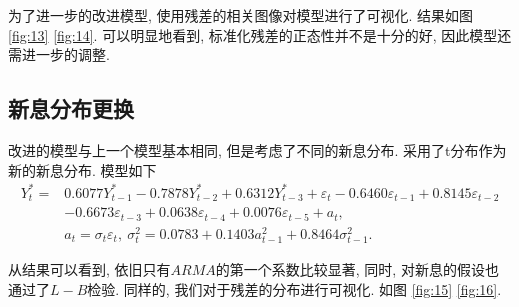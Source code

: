 \documentclass[12pt]{article}
\begin{document}
\qquad 为了进一步的改进模型, 使用残差的相关图像对模型进行了可视化. 结果如图 \ref{fig:13} \ref{fig:14}. 可以明显地看到, 标准化残差的正态性并不是十分的好, 因此模型还需进一步的调整.

\subsection{新息分布更换}
\qquad 改进的模型与上一个模型基本相同, 但是考虑了不同的新息分布. 采用了t分布作为新的新息分布. 模型如下
\[
    \begin{aligned}
        Y_{t}^*=&0.6077 Y_{t-1}^*-0.7878 Y_{t-2}^*+0.6312 Y_{t-3}^*+\varepsilon_{t}-0.6460\varepsilon_{t-1}+ 0.8145\varepsilon_{t-2}\\&-0.6673\varepsilon_{t-3}+0.0638\varepsilon_{t-4}+ 0.0076\varepsilon_{t-5}+a_{t},\\&a_{t}=\sigma_{t} \varepsilon_{t},\ 
        \sigma_{t}^{2} =0.0783+ 0.1403 a_{t-1}^{2}+ 0.8464 \sigma_{t-1}^{2}.
    \end{aligned}
\]

\qquad 从结果可以看到, 依旧只有$ARMA$的第一个系数比较显著, 同时, 对新息的假设也通过了$L-B$检验. 同样的, 我们对于残差的分布进行可视化. 如图 \ref{fig:15} \ref{fig:16}.
\end{document}
